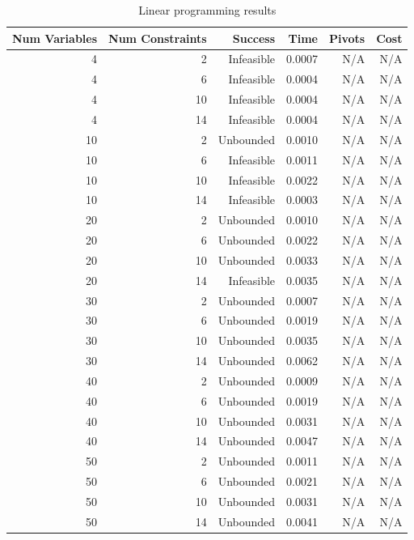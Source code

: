 \begin{table}[ht]
    \centering
    \begin{tabular}{rrrrrr}
        \toprule
        Num Variables & Num Constraints & Success & Time & Pivots & Cost \\
        \midrule
        4 & 2 & Infeasible & 0.0007 & N/A & N/A \\
		4 & 6 & Infeasible & 0.0004 & N/A & N/A \\
		4 & 10 & Infeasible & 0.0004 & N/A & N/A \\
		4 & 14 & Infeasible & 0.0004 & N/A & N/A \\
		10 & 2 & Unbounded & 0.0010 & N/A & N/A \\
		10 & 6 & Infeasible & 0.0011 & N/A & N/A \\
		10 & 10 & Infeasible & 0.0022 & N/A & N/A \\
		10 & 14 & Infeasible & 0.0003 & N/A & N/A \\
		20 & 2 & Unbounded & 0.0010 & N/A & N/A \\
		20 & 6 & Unbounded & 0.0022 & N/A & N/A \\
		20 & 10 & Unbounded & 0.0033 & N/A & N/A \\
		20 & 14 & Infeasible & 0.0035 & N/A & N/A \\
		30 & 2 & Unbounded & 0.0007 & N/A & N/A \\
		30 & 6 & Unbounded & 0.0019 & N/A & N/A \\
		30 & 10 & Unbounded & 0.0035 & N/A & N/A \\
		30 & 14 & Unbounded & 0.0062 & N/A & N/A \\
		40 & 2 & Unbounded & 0.0009 & N/A & N/A \\
		40 & 6 & Unbounded & 0.0019 & N/A & N/A \\
		40 & 10 & Unbounded & 0.0031 & N/A & N/A \\
		40 & 14 & Unbounded & 0.0047 & N/A & N/A \\
		50 & 2 & Unbounded & 0.0011 & N/A & N/A \\
		50 & 6 & Unbounded & 0.0021 & N/A & N/A \\
		50 & 10 & Unbounded & 0.0031 & N/A & N/A \\
		50 & 14 & Unbounded & 0.0041 & N/A & N/A \\
        \bottomrule
    \end{tabular}
    \caption{Linear programming results}
    \label{tab:lp-results}
\end{table}